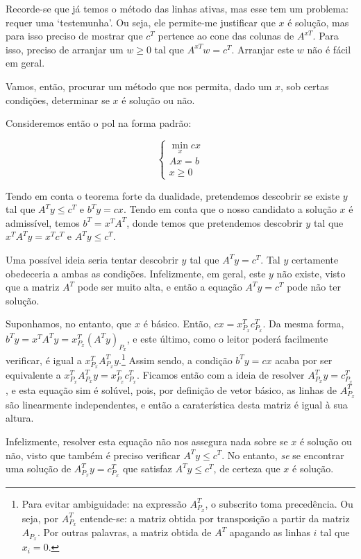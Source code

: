 \documentclass{article}
\theoremstyle{definition}
\begin{document}
	Recorde-se que já temos o método das linhas ativas, mas esse tem um problema: requer uma `testemunha'. Ou seja, ele permite-me justificar que $x$ é solução, mas para isso preciso de mostrar que $c^T$ pertence ao cone das colunas de $A^{xT}$. Para isso, preciso de arranjar um $w \geq 0$ tal que $A^{xT} w = c^T$. Arranjar este $w$ não é fácil em geral.
	
	Vamos, então, procurar um método que nos permita, dado um $x$, sob certas condições, determinar se $x$ é solução ou não.
	
	Consideremos então o pol na forma padrão:
	
	\[
	\begin{cases}
	\min\limits_x cx\\
	Ax = b\\
	x \geq 0
	\end{cases}
	\]
	
	Tendo em conta o teorema forte da dualidade, pretendemos descobrir se existe $y$ tal que $A^T y \leq c^T$ e $b^T y = cx$. Tendo em conta que o nosso candidato a solução $x$ é admissível, temos $b^T = x^T A^T$, donde temos que pretendemos descobrir $y$ tal que $x^T A^T y = x^T c^T$ e $A^T y \leq c^T$.
	
	Uma possível ideia seria tentar descobrir $y$ tal que $A^T y = c^T$. Tal $y$ certamente obedeceria a ambas as condições. Infelizmente, em geral, este $y$ não existe, visto que a matriz $A^T$ pode ser muito alta, e então a equação $A^T y = c^T$ pode não ter solução.
	
	Suponhamos, no entanto, que $x$ é básico. Então, $cx = x_{P_x}^T c_{P_x}^T$. Da mesma forma, $b^T y = x^T A^T y = x_{P_x}^T (A^T y)_{P_x}$, e este último, como o leitor poderá facilmente verificar, é igual a $x_{P_x}^T A_{P_x}^T y$.\footnote{Para evitar ambiguidade: na expressão $A_{P_x}^T$, o subscrito toma precedência. Ou seja, por $A_{P_x}^T$ entende-se: a matriz obtida por transposição a partir da matriz $A_{P_x}$. Por outras palavras, a matriz obtida de $A^T$ apagando as linhas $i$ tal que $x_i = 0$.}  Assim sendo, a condição $b^T y = cx$ acaba por ser equivalente a $x_{P_x}^T A_{P_x}^T y = x_{P_x}^T c_{P_x}^T$. Ficamos então com a ideia de resolver $A_{P_x}^T y = c_{P_x}^T$, e esta equação sim é solúvel, pois, por definição de vetor básico, as linhas de $A_{P_x}^T$ são linearmente independentes, e então a caraterística desta matriz é igual à sua altura.
	
	Infelizmente, resolver esta equação não nos assegura nada sobre se $x$ é solução ou não, visto que também é preciso verificar $A^T y \leq c^T$. No entanto, \emph{se} se encontrar uma solução de $A_{P_x}^T y = c_{P_x}^T$ que satisfaz $A^T y \leq c^T$, de certeza que $x$ é solução.
	
\end{document}
